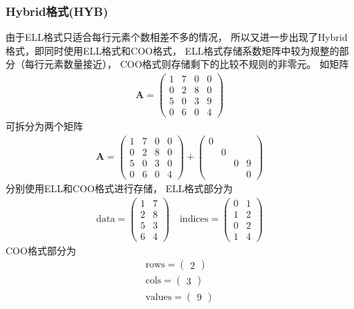 \subsubsection{Hybrid格式(HYB)}
由于ELL格式只适合每行元素个数相差不多的情况，
所以又进一步出现了Hybrid格式，即同时使用ELL格式和COO格式，
ELL格式存储系数矩阵中较为规整的部分（每行元素数量接近），
COO格式则存储剩下的比较不规则的非零元。\cite{bell2008spmv}
如矩阵
\begin{align*}
\bm{A}=\begin{pmatrix}
1 & 7 & 0 & 0\\
0 & 2 & 8 & 0\\
5 & 0 & 3 & 9\\
0 & 6 & 0 & 4
\end{pmatrix}
\end{align*}
可拆分为两个矩阵
\begin{align*}
\bm{A}=\begin{pmatrix}
1 & 7 & 0 & 0\\
0 & 2 & 8 & 0\\
5 & 0 & 3 & 0\\
0 & 6 & 0 & 4
\end{pmatrix}
+
\begin{pmatrix}
0 &  &  & \\
 & 0 &  & \\
 &  & 0 & 9\\
 &  &  & 0
\end{pmatrix}
\end{align*}
分别使用ELL和COO格式进行存储，
ELL格式部分为
\begin{align*}
\mathrm{data}=\begin{pmatrix}
1 & 7\\
2 & 8\\
5 & 3\\
6 & 4
\end{pmatrix}
\quad
\mathrm{indices}=\begin{pmatrix}
0 & 1\\
1 & 2\\
0 & 2\\
1 & 4
\end{pmatrix}
\end{align*}
COO格式部分为
\begin{align*}
\mathrm{rows}=\begin{pmatrix}
2
\end{pmatrix}
\\
\mathrm{cols}=\begin{pmatrix}
3
\end{pmatrix}
\\
\mathrm{values}=\begin{pmatrix}
9
\end{pmatrix}
\end{align*}

